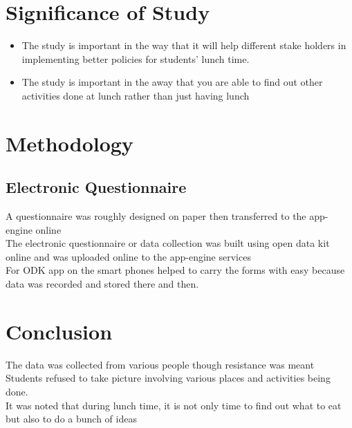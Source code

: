 \documentclass[12pt,a4paper]{article}
\begin{document}
\section{Significance of Study}
\begin{itemize}
\item The study is important in the way that it will help different stake holders in implementing better policies for students' lunch time.
\item The study is important in the away that you are able to find out other activities done at lunch rather than just having lunch
\end{itemize}

\section{Methodology}
\subsection{Electronic Questionnaire}
A questionnaire was roughly designed on paper then transferred to the app-engine online\\
The electronic questionnaire or data collection was built using open data kit online and was uploaded online to the app-engine services\\
For ODK app on the smart phones helped to carry the forms with easy because data was recorded and stored there and then.\\
\section{Conclusion}
The data was collected from various people though resistance was meant
Students refused to take picture involving various places and activities being done.\\
It was noted that during lunch time, it is not only time to find out what to eat but also to do a bunch of ideas
\end{document}
